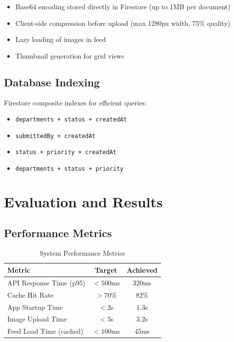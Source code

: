 \documentclass[12pt,a4paper]{article}
\begin{document}
\begin{itemize}
    \item Base64 encoding stored directly in Firestore (up to 1MB per document)
    \item Client-side compression before upload (max 1280px width, 75\% quality)
    \item Lazy loading of images in feed
    \item Thumbnail generation for grid views
\end{itemize}

\subsection{Database Indexing}

Firestore composite indexes for efficient queries:
\begin{itemize}
    \item \texttt{departments + status + createdAt}
    \item \texttt{submittedBy + createdAt}
    \item \texttt{status + priority + createdAt}
    \item \texttt{departments + status + priority}
\end{itemize}

\section{Evaluation and Results}

\subsection{Performance Metrics}

\begin{table}[H]
\centering
\caption{System Performance Metrics}
\begin{tabular}{lcc}
\toprule
\textbf{Metric} & \textbf{Target} & \textbf{Achieved} \\
\midrule
API Response Time (p95) & $< 500$ms & $320$ms \\
Cache Hit Rate & $> 70\%$ & $82\%$ \\
App Startup Time & $< 2$s & $1.3$s \\
Image Upload Time & $< 5$s & $3.2$s \\
Feed Load Time (cached) & $< 100$ms & $45$ms \\
\bottomrule
\end{tabular}
\end{table}
\end{document}
